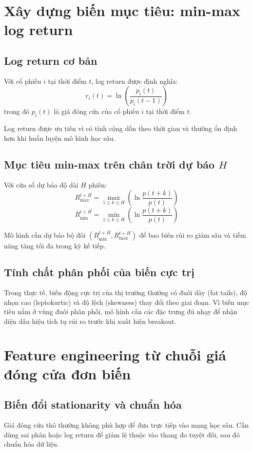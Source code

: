 \documentclass[12pt,a4paper]{article}
\begin{document}
\section{Xây dựng biến mục tiêu: min-max log return}
\subsection{Log return cơ bản}
Với cổ phiếu $i$ tại thời điểm $t$, log return được định nghĩa:
\begin{equation}
r_i(t)=\ln\left(\frac{p_i(t)}{p_i(t-1)}\right)
\end{equation}
trong đó $p_i(t)$ là giá đóng cửa của cổ phiếu $i$ tại thời điểm $t$.

Log return được ưu tiên vì có tính cộng dồn theo thời gian và thường ổn định hơn khi huấn luyện mô hình học sâu.

\subsection{Mục tiêu min-max trên chân trời dự báo $H$}
Với cửa sổ dự báo độ dài $H$ phiên:
\begin{equation}
R_{\max}^{t+H}=\max_{1\le k\le H}\left(\ln\frac{p(t+k)}{p(t)}\right)
\end{equation}
\begin{equation}
R_{\min}^{t+H}=\min_{1\le k\le H}\left(\ln\frac{p(t+k)}{p(t)}\right)
\end{equation}

Mô hình cần dự báo bộ đôi $\left(R_{\min}^{t+H},R_{\max}^{t+H}\right)$ để bao biên rủi ro giảm sâu và tiềm năng tăng tối đa trong kỳ kế tiếp.

\subsection{Tính chất phân phối của biến cực trị}
Trong thực tế, biến động cực trị của thị trường thường có đuôi dày (fat tails), độ nhọn cao (leptokurtic) và độ lệch (skewness) thay đổi theo giai đoạn. Vì biến mục tiêu nằm ở vùng đuôi phân phối, mô hình cần các đặc trưng đủ nhạy để nhận diện dấu hiệu tích tụ rủi ro trước khi xuất hiện breakout.

\section{Feature engineering từ chuỗi giá đóng cửa đơn biến}
\subsection{Biến đổi stationarity và chuẩn hóa}
Giá đóng cửa thô thường không phù hợp để đưa trực tiếp vào mạng học sâu. Cần dùng sai phân hoặc log return để giảm lệ thuộc vào thang đo tuyệt đối, sau đó chuẩn hóa dữ liệu.
\end{document}
